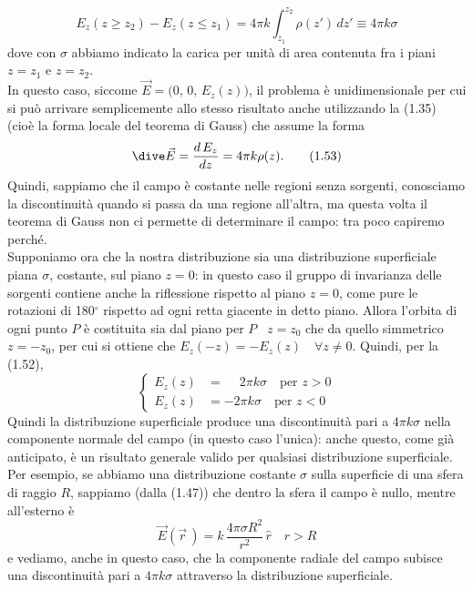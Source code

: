 \begin{enumerate}
\begin{equation}
E_z(z\ge z_2)-E_z(z\le z_1)=4\pi k\int_{z_1}^{z_2}\rho(z')\,dz'\equiv4\pi k\sigma
\tag{1.52}
\end{equation}
dove con $\sigma$ abbiamo indicato la carica per unità di area contenuta fra i piani $z=z_1$ e $z=z_2$.\\
In questo caso, siccome $\vec E=\big(0,\,0,\,E_z(z)\big)$, il problema è unidimensionale per cui si può arrivare semplicemente allo stesso risultato anche utilizzando la (1.35) (cioè la forma locale del teorema di Gauss) che assume la forma
\begin{equation}
\dive\vec E=\frac{d\,E_z}{dz}=4\pi k\rho(z).
\tag{1.53}
\end{equation}
Quindi, sappiamo che il campo è costante nelle regioni senza sorgenti, conosciamo la discontinuità quando si passa da una regione all'altra, ma questa volta il teorema di Gauss non ci permette di determinare il campo: tra poco capiremo perché.\\
Supponiamo ora che la nostra distribuzione sia una distribuzione superficiale piana $\sigma$, costante, sul piano $z=0$: in questo caso il gruppo di invarianza delle sorgenti contiene anche la riflessione rispetto al piano $z=0$, come pure le rotazioni di 180$^\circ$ rispetto ad ogni retta giacente in detto piano. Allora l'orbita di ogni punto $P$ è costituita sia dal piano per $P$ \ $z=z_0$ che da quello simmetrico $z=-z_0$, per cui si ottiene che $E_z(-z)=-E_z(z)\quad\forall z\neq0$. Quindi, per la (1.52),
\begin{equation}
\left\{\begin{aligned}
E_z(z)&=\phantom{-}2\pi k\sigma\quad\text{per }z>0\\
E_z(z)&=-2\pi k\sigma\quad\text{per }z<0
\end{aligned}\right.
\tag{1.54}
\end{equation}
Quindi la distribuzione superficiale produce una discontinuità pari a $4\pi k\sigma$ nella
componente normale del campo (in questo caso l'unica): anche questo, come già anticipato, è un risultato generale valido per qualsiasi distribuzione superficiale. Per esempio, se abbiamo una distribuzione costante $\sigma$ sulla superficie di una sfera di raggio $R$, sappiamo \big(dalla (1.47)\big) che dentro la sfera il campo è nullo, mentre all'esterno è
\begin{equation}
\vec E(\vec r\,)=k\,\frac{4\pi\sigma R^2}{r^2}\,\hat r\quad r>R
\tag{1.55}
\end{equation}
e vediamo, anche in questo caso, che la componente radiale del campo subisce una discontinuità pari a $4\pi k\sigma$ attraverso la distribuzione superficiale.\\

\end{enumerate}
